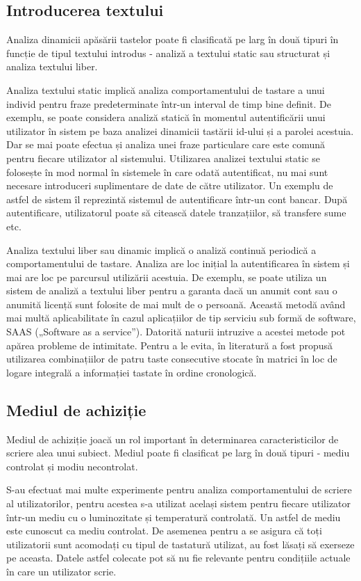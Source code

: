 \documentclass[9pt,shortpaper,twoside,web]{ieeecolor}
\begin{document}
	
\subsection{Introducerea textului}
	Analiza dinamicii apăsării tastelor poate fi clasificată pe larg în două tipuri în funcție de tipul textului introdus - analiză a textului static sau structurat și analiza textului liber. 
	
	Analiza textului static implică analiza comportamentului de tastare a unui individ pentru fraze predeterminate într-un interval de timp bine definit. De exemplu, se poate considera analiză statică în momentul autentificării unui utilizator în sistem pe baza analizei dinamicii tastării id-ului și a parolei acestuia. Dar se mai  poate efectua și analiza unei fraze particulare care este comună pentru fiecare utilizator al sistemului. Utilizarea analizei textului static se folosește în mod normal în sistemele în care odată autentificat, nu mai sunt necesare introduceri suplimentare de date de către utilizator. Un exemplu de astfel de sistem îl reprezintă sistemul de autentificare într-un cont bancar. După autentificare, utilizatorul poate să citească datele tranzațiilor, să transfere sume etc.

	Analiza textului liber sau dinamic implică o analiză continuă periodică a comportamentului de tastare. Analiza are loc inițial la autentificarea în sistem și mai are loc pe parcursul utilizării acestuia. De exemplu, se poate utiliza un sistem de analiză a textului liber pentru a garanta dacă un anumit cont sau o anumită licență sunt folosite de mai mult de o persoană. Această metodă având mai multă aplicabilitate în cazul aplicațiilor de tip serviciu sub formă de software, SAAS („Software as a service”). Datorită naturii intruzive a acestei metode pot apărea probleme de intimitate. Pentru a le evita, în literatură a fost propusă utilizarea combinațiilor de patru taste consecutive stocate în matrici în loc de logare integrală a informației tastate în ordine cronologică.


\subsection{Mediul de achiziție}
	Mediul de achiziție joacă un rol important în determinarea caracteristicilor de scriere alea unui subiect. Mediul poate fi clasificat pe larg în două tipuri - mediu controlat și modiu necontrolat.

	S-au efectuat mai multe experimente pentru analiza comportamentului de scriere al utilizatorilor, pentru acestea s-a utilizat același sistem pentru fiecare utilizator într-un mediu cu o luminozitate și temperatură controlată. Un astfel de mediu este cunoscut ca mediu controlat. De asemenea pentru a se asigura că toți utilizatorii sunt acomodați cu tipul de tastatură utilizat, au fost lăsați să exerseze pe aceasta. Datele astfel colecate pot să nu fie relevante pentru condițiile actuale în care un utilizator scrie.
	
\end{document}
